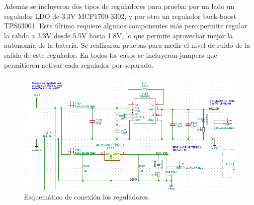 Además se incluyeron dos tipos de reguladores para prueba: por un lado un regulador LDO de 3.3V MCP1700-3302, y por otro un regulador buck-boost TPS63001. Este último requiere algunos componentes más pero permite regular la salida a 3.3V desde 5.5V hasta 1.8V, lo que permite aprovechar mejor la autonomía de la batería. Se realizaron pruebas para medir el nivel de ruido de la salida de este regulador. En todos los casos se incluyeron jumpers que permitieron activar cada regulador por separado.

\begin{figure}[!htbp]
	\centering
	
	\begin{minipage}{0.6\textwidth}
		\includegraphics[width=\textwidth]{./Figures/reguladores.png}		
	\end{minipage}		
	
	\caption{Esquemático de conexión los reguladores.}
	\label{fig:reguladores}
\end{figure}